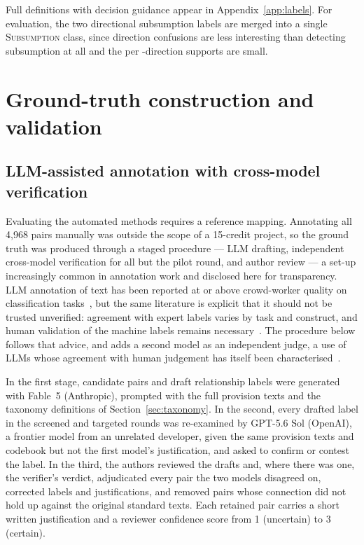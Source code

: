 Full definitions with decision guidance appear in
Appendix~\ref{app:labels}. For evaluation, the two directional subsumption
labels are merged into a single \textsc{Subsumption} class, since direction
confusions are less interesting than detecting subsumption at all and the per
-direction supports are small.

\section{Ground-truth construction and validation}\label{sec:gt}

\subsection{LLM-assisted annotation with cross-model verification}

Evaluating the automated methods requires a reference mapping. Annotating all
4{,}968 pairs manually was outside the scope of a 15-credit project, so the
ground truth was produced through a staged procedure --- LLM drafting,
independent cross-model verification for all but the pilot round, and author
review --- a set-up
increasingly common in annotation work and disclosed here for transparency.
LLM annotation of text has been reported at or above crowd-worker quality on
classification tasks~\cite{gilardi2023chatgpt}, but the same literature is
explicit that it should not be trusted unverified: agreement with expert labels
varies by task and construct, and human validation of the machine labels remains
necessary~\cite{ziems2024css}. The procedure below follows that advice, and adds
a second model as an independent judge, a use of LLMs whose agreement with human
judgement has itself been characterised~\cite{zheng2023judge}.

In the first stage, candidate pairs and draft relationship labels were
generated with Fable~5 (Anthropic), prompted with the full provision texts and
the taxonomy definitions of Section~\ref{sec:taxonomy}. In the second, every
drafted label in the screened and targeted rounds was re-examined by GPT-5.6 Sol
(OpenAI), a frontier model from an unrelated developer, given the same provision
texts and codebook but not the first model's justification, and asked to confirm
or contest the label. In the
third, the authors reviewed the drafts and, where there was one, the verifier's
verdict, adjudicated every pair the two models disagreed on, corrected labels
and justifications, and removed pairs whose connection did not hold up against
the original standard texts. Each retained pair carries a short written
justification and a reviewer confidence score from 1 (uncertain) to 3 (certain).

